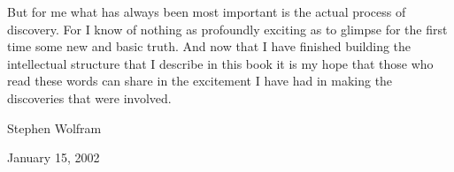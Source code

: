 But for me what has always been most important is the actual process of
discovery.
For I know of nothing as profoundly exciting as to glimpse for the first time
some new and basic truth.
And now that I have finished building the intellectual structure that I describe
in this book it is my hope that those who read these words can share in the
excitement I have had in making the discoveries that were involved.

\bigskip
\hfill Stephen Wolfram


\hfill January 15, 2002

